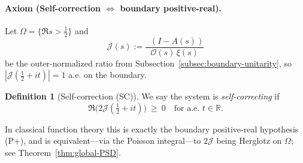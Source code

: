 \documentclass[11pt]{article}
\theoremstyle{definition}
\newtheorem{definition}[theorem]{Definition}
\theoremstyle{remark}
\newcommand{\R}{\mathbb{R}}
\DeclareMathOperator{\dettwo}{det_2}
\begin{document}
\paragraph{Axiom (Self-correction $\Leftrightarrow$ boundary positive-real).}
Let \(\Omega=\{\Re s>\tfrac12\}\) and
\[\mathcal J(s):=\frac{\dettwo(I-A(s))}{\mathcal O(s)\,\xi(s)}\]
be the outer-normalized ratio from Subsection~\ref{subsec:boundary-unitarity}, so $|\mathcal J(\tfrac12+it)|=1$ a.e. on the boundary. 
\begin{definition}[Self-correction (SC)]\label{def:SC}
We say the system is \emph{self-correcting} if
\[\Re\bigl(2\mathcal J(\tfrac12+it)\bigr)\ \ge\ 0\quad\text{for a.e. }t\in\R.\]
\end{definition}
In classical function theory this is exactly the boundary positive-real hypothesis (P+), and is equivalent—via the Poisson integral—to $2\mathcal J$ being Herglotz on $\Omega$; see Theorem~\ref{thm:global-PSD}.
\end{document}
